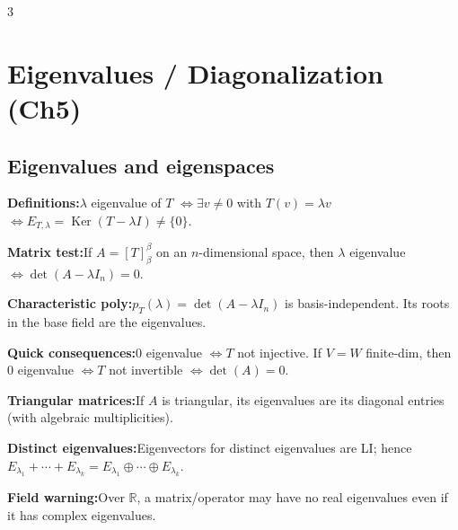 \documentclass[10pt]{article}
\newcommand{\R}{\mathbb{R}}
\newcommand{\Ker}{\operatorname{Ker}}
\newenvironment{cheatitems}{\par\vspace{-1pt}}{\par\vspace{-1pt}}
\newcommand{\cheatrow}[2]{%
  \par\noindent\textbf{#1:}\nobreak\enspace #2\par
}
\begin{document}
\begin{multicols}{3}
\section*{Eigenvalues / Diagonalization (Ch5)}

\subsection*{Eigenvalues and eigenspaces}
\begin{cheatitems}
\cheatrow{Definitions}{$\lambda$ eigenvalue of $T$ $\iff \exists v\neq 0$ with $T(v)=\lambda v$ $\iff E_{T,\lambda}=\Ker(T-\lambda I)\neq\{0\}$.}
\cheatrow{Matrix test}{If $A=[T]^\beta_\beta$ on an $n$-dimensional space, then $\lambda$ eigenvalue $\iff \det(A-\lambda I_n)=0$.}
\cheatrow{Characteristic poly}{$p_T(\lambda)=\det(A-\lambda I_n)$ is basis-independent. Its roots in the base field are the eigenvalues.}
\cheatrow{Quick consequences}{$0$ eigenvalue $\iff T$ not injective. If $V=W$ finite-dim, then $0$ eigenvalue $\iff T$ not invertible $\iff \det(A)=0$.}
\cheatrow{Triangular matrices}{If $A$ is triangular, its eigenvalues are its diagonal entries (with algebraic multiplicities).}
\cheatrow{Distinct eigenvalues}{Eigenvectors for distinct eigenvalues are LI; hence $E_{\lambda_1}+\cdots+E_{\lambda_k}=E_{\lambda_1}\oplus\cdots\oplus E_{\lambda_k}$.}
\cheatrow{Field warning}{Over $\R$, a matrix/operator may have no real eigenvalues even if it has complex eigenvalues.}
\end{cheatitems}


\end{multicols}
\end{document}
